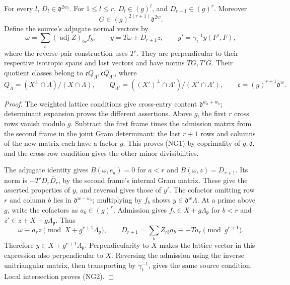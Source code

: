 \begin{lemma}
\label{lem:nonzero-gram-normal-content}
For every \(l\), \(D_l\in\mathfrak d^{2w_l}\). For \(1\le l\le r\),
\(D_l\in(g)^l\), and \(D_{r+1}\in(g)^r\). Moreover
\[
 G\in(g)^{2(r+1)}\mathfrak d^{2w}.
 \tag{NG1}
\]
Define the source's adjugate normal vectors by
\[
 \omega=\sum_b(\operatorname{adj}Z)_{br}f_b,\qquad
 y=T\omega+D_{r+1}z,\qquad
 y'=\gamma_t^{-1}y(F',F),
\]
where the reverse-pair construction uses \(T'\).
They are perpendicular to their respective isotropic spans
and last vectors and have norms \(TG,T'G\).
Their quotient classes belong to
\(\mathfrak c Q_\Lambda,\mathfrak c Q_{\Lambda'}\), where
\[
 Q_\Lambda=(X^\perp\cap\Lambda)/(X\cap\Lambda),\qquad
 Q_{\Lambda'}=((X')^\perp\cap\Lambda')/(X'\cap\Lambda'),
 \qquad \mathfrak c=(g)^{r+1}\mathfrak d^w.                 \tag{NG2}
\]
\end{lemma}
\begin{proof}
The weighted lattice conditions give cross-entry content
\(\mathfrak d^{w_a+w_b}\); determinant expansion proves the
different assertions. Above \(g\), the first \(r\) cross rows
vanish modulo \(g\). Subtract the first frame times the
admission matrix from the second frame in the joint Gram
determinant: the last \(r+1\) rows and columns of the new
matrix each have a factor \(g\). This proves (NG1) by
coprimality of \(g,\mathfrak d\), and the cross-row condition
gives the other minor divisibilities.

The adjugate identity gives \(B(\omega,e_a)=0\) for \(a<r\)
and \(B(\omega,z)=D_{r+1}\). Its norm is
\(-T'D_r\bar D_r\), by the second frame's internal Gram
matrix. These give the asserted properties of \(y\), and
reversal gives those of \(y'\). The cofactor omitting row
\(r\) and column \(b\) lies in \(\mathfrak d^{w-w_b}\);
multiplying by \(f_b\) shows \(y\in\mathfrak d^w\Lambda\).
At a prime above \(g\), write the cofactors as \(a_b\in(g)^r\).
Admission gives \(f_b\in X+g\Lambda_{\mathfrak p}\) for \(b<r\)
and \(z'\in z+X+g\Lambda_{\mathfrak p}\). Thus
\[
 \omega\equiv a_rz\pmod{X+g^{r+1}\Lambda_{\mathfrak p}},
 \qquad D_{r+1}=\sum_b Z_{rb}a_b\equiv-Ta_r\pmod{g^{r+1}} .
\]
Therefore \(y\in X+g^{r+1}\Lambda_{\mathfrak p}\).
Perpendicularity to \(X\) makes the lattice vector in this
expression also perpendicular to \(X\). Reversing the
admission using the inverse unitriangular matrix, then
transporting by \(\gamma_t^{-1}\), gives the same source
condition. Local intersection proves (NG2).
\end{proof}

